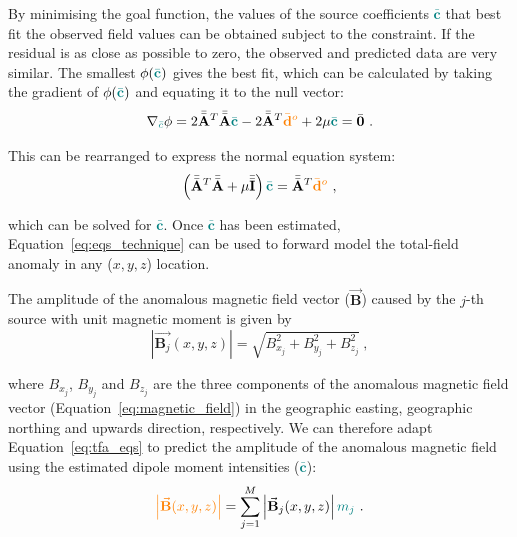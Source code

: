 \noindent
By minimising the goal function, the values of the source coefficients \textcolor{teal}{$\bar{\mathbf{c}}$} that best fit the observed field values can be obtained subject to the constraint. If the residual is as close as possible to zero, the observed and predicted data are very similar. The smallest $\phi(\textcolor{teal}{\bar{\mathbf{c}}})$ gives the best fit, which can be calculated by taking the gradient of $\phi(\textcolor{teal}{\bar{\mathbf{c}}})$ and equating it to the null vector:
\begin{equation}
    \nabla_{\textcolor{teal}{\bar{c}}} \phi = 2 \Bar{\Bar{\mathbf{A}}}^T \Bar{\Bar{\mathbf{A}}} \textcolor{teal}{\Bar{\mathbf{c}}} - 2\Bar{\Bar{\mathbf{A}}}^T\textcolor{orange}{\bar{\mathbf{d}}^o} + 2\mu \textcolor{teal}{\bar{\mathbf{c}}} = \bar{\mathbf{0}}
    \ .
\end{equation}

\noindent
This can be rearranged to express the normal equation system:
\begin{equation}
    \left( \Bar{\Bar{\mathbf{A}}}^T \Bar{\Bar{\mathbf{A}}} +  \mu \bar{\bar{\mathbf{I}}} \right) \textcolor{teal}{\bar{\mathbf{c}}} = 
    \Bar{\Bar{\mathbf{A}}}^T\textcolor{orange}{\bar{\mathbf{d}}^o}
    \ ,
    \label{eq:normal_equations}
\end{equation}

\noindent
which can be solved for \textcolor{teal}{$\bar{\mathbf{c}}$}. Once \textcolor{teal}{$\bar{\mathbf{c}}$} has been estimated, Equation~\ref{eq:eqs_technique} can be used to forward model the total-field anomaly in any ($x, y, z$) location.


The amplitude of the anomalous magnetic field vector ($\vec{\mathbf{B}}$) caused by the $j$-th source with unit magnetic moment is given by
\begin{equation}
    \left\lvert \vec{\mathbf{B}_j}(x,y,z) \right\rvert = \sqrt{B^2_{x_j} + B^2_{y_j} +B^2_{z_j}}
    \ ,
\end{equation}

\noindent
where $B_{x_j}$, $B_{y_j}$ and $B_{z_j}$ are the three components of the anomalous magnetic field vector (Equation~\ref{eq:magnetic_field}) in the geographic easting, geographic northing and upwards direction, respectively. We can therefore adapt Equation~\ref{eq:tfa_eqs} to predict the amplitude of the anomalous magnetic field using the estimated dipole moment intensities (\textcolor{teal}{$\bar{\mathbf{c}}$}):
\begin{equation}
\textcolor{orange}{\left\lvert \vec{\mathbf{B}}(x,y,z) \right\rvert} = \sum_{j=1}^{M}  \left\lvert \vec{\mathbf{B}}_{j}(x,y,z) \right\rvert \textcolor{teal}{m_j}
\ .
\end{equation}


